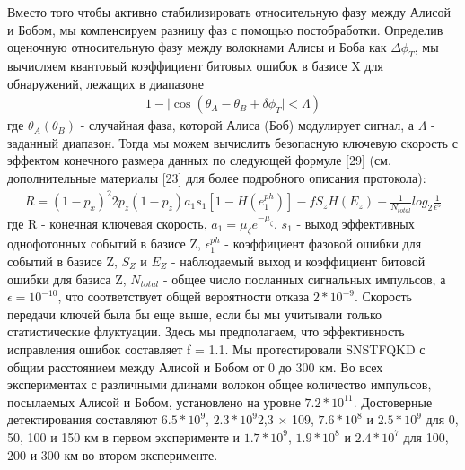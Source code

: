  Вместо того чтобы активно стабилизировать относительную фазу между Алисой и Бобом, мы компенсируем разницу фаз с помощью постобработки. Определив оценочную относительную фазу между волокнами Алисы и Боба как $\Delta\phi_T$, мы вычисляем квантовый коэффициент битовых ошибок в базисе X для обнаружений, лежащих в диапазоне 
 \begin{align}
    1 - |\cos(\theta_A - \theta_B + \delta\phi_T| < \Lambda)
\end{align}\label{eq: QBER error TF}
 где $\theta_A (\theta_B)$ - случайная фаза, которой Алиса (Боб) модулирует сигнал, а $\Lambda$ - заданный диапазон. Тогда мы можем вычислить безопасную ключевую скорость с эффектом конечного размера данных по следующей формуле [29] (см. дополнительные материалы [23] для более подробного описания протокола):
 \begin{align}
    R = (1 - p_x)^2{2p_z(1-p_z)a_1s_1[1 - H(e_1^{ph})] - fS_zH(E_z)} - \frac{1}{N_{total}}log_2\frac{1}{\epsilon^5}
\end{align}\label{eq: TF qkd rate lit}
 где R - конечная ключевая скорость, $a_1 = \mu_{\zeta}e^{-\mu_{\zeta}}$, $s_1$ - выход эффективных однофотонных событий в базисе Z, $\epsilon_1^{ph}$ - коэффициент фазовой ошибки для событий в базисе Z, $S_Z$ и $E_Z$ - наблюдаемый выход и коэффициент битовой ошибки для базиса Z, $N_{total}$ - общее число посланных сигнальных импульсов, а $\epsilon =10^{-10}$, что соответствует общей вероятности отказа $2*10^{-9}$. Скорость передачи ключей была бы еще выше, если бы мы учитывали только статистические флуктуации. Здесь мы предполагаем, что эффективность исправления ошибок составляет f = 1.1. Мы протестировали SNSTFQKD с общим расстоянием между Алисой и Бобом от 0 до 300 км.  Во всех экспериментах с различными длинами волокон общее количество импульсов, посылаемых Алисой и Бобом, установлено на уровне $7.2*10^{11}$. Достоверные детектирования составляют $6.5*10^{9}$, $2.3*10^{9}$2,3 × 109, $7.6*10^{8}$ и $2.5*10^{9}$ для 0, 50, 100 и 150 км в первом эксперименте и $1.7*10^{9}$, $1.9*10^{8}$  и  $2.4*10^{7}$ для 100, 200 и 300 км во втором эксперименте. 
